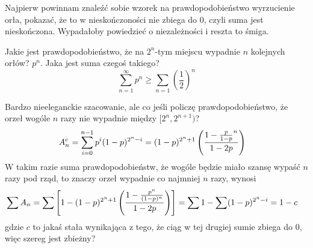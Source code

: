 \documentclass{article}
\begin{document}
Najpierw powinnam znaleźć sobie wzorek na prawdopodobieństwo wyrzucienie orła, pokazać, że to w nieskończoności nie zbiega do $0$, czyli suma jest nieskończona. Wypadałoby powiedzieć o niezależności i reszta to śmiga.

Jakie jest prawdopodobieństwo, że na $2^n$-tym miejscu wypadnie $n$ kolejnych orłów? $p^n$. Jaka jest suma czegoś takiego?
$$\sum\limits_{n=1}^\infty p^n\geq\sum\limits_{n=1}\left(\frac12\right)^n$$


Bardzo nieeleganckie szacowanie, ale co jeśli policzę prawdopodobieństwo, że orzeł wogóle $n$ razy nie wypadnie między $[2^n,2^{n+1})$?
\begin{align*}
    A_n^c&=\sum\limits_{i=0}^{n-1}p^i(1-p)^{2^n-i}=(1-p)^{2^n+1}\left({1-{p\over 1-p}^n\over1-2p}\right)
\end{align*}
W takim razie suma prawdopodobieństw, że wogóle będzie miało szansę wypaść $n$ razy pod rząd, to znaczy orzeł wypadnie co najmniej $n$ razy, wynosi
\begin{align*}
    \sum A_n&=\sum\left[1-(1-p)^{2^n+1}\left({1-{p^n\over(1-p)^n}\over1-2p}\right)\right]=\sum1-\sum(1-p)^{2^n-i}=1-c
\end{align*}
gdzie $c$ to jakaś stała wynikająca z tego, że ciąg w tej drugiej sumie zbiega do $0$, więc szereg jest zbieżny?
\end{document}

